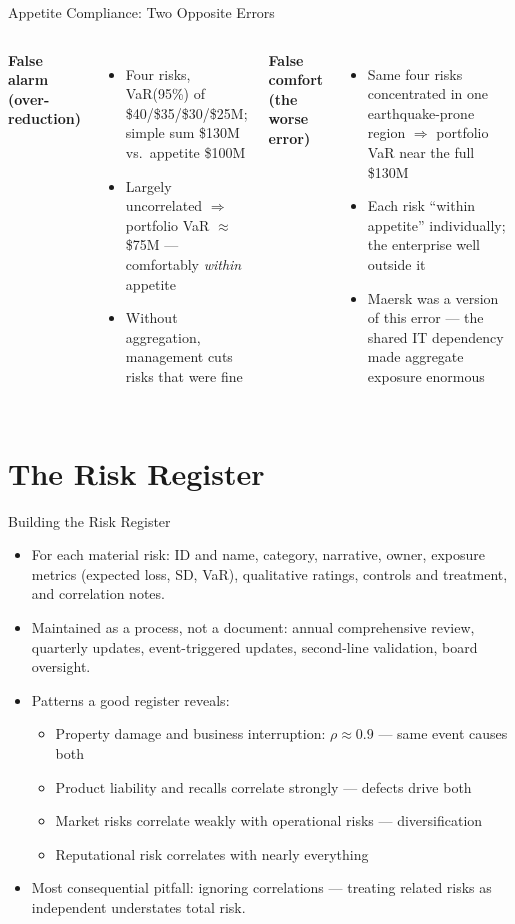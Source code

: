 \documentclass[11pt, aspectratio=169]{beamer}
\begin{document}
\begin{frame}{Appetite Compliance: Two Opposite Errors}
\begin{columns}[T]
\textbf{False alarm (over-reduction)}
\begin{itemize}
  \item Four risks, VaR(95\%) of \$40/\$35/\$30/\$25M; simple sum \$130M vs.\ appetite \$100M
  \item Largely uncorrelated $\Rightarrow$ portfolio VaR $\approx$ \$75M --- comfortably \emph{within} appetite
  \item Without aggregation, management cuts risks that were fine
\end{itemize}
\textbf{False comfort (the worse error)}
\begin{itemize}
  \item Same four risks concentrated in one earthquake-prone region $\Rightarrow$ portfolio VaR near the full \$130M
  \item Each risk ``within appetite'' individually; the enterprise well outside it
  \item Maersk was a version of this error --- the shared IT dependency made aggregate exposure enormous
\end{itemize}
\end{columns}
\end{frame}

\section{The Risk Register}

\begin{frame}{Building the Risk Register}
\begin{itemize}
  \item For each material risk: ID and name, category, narrative, \alert{owner}, exposure metrics (expected loss, SD, VaR), qualitative ratings, controls and treatment, and \alert{correlation notes}.
  \item Maintained as a process, not a document: annual comprehensive review, quarterly updates, event-triggered updates, second-line validation, board oversight.
  \item Patterns a good register reveals:
  \begin{itemize}
    \item Property damage and business interruption: $\rho \approx 0.9$ --- same event causes both
    \item Product liability and recalls correlate strongly --- defects drive both
    \item Market risks correlate weakly with operational risks --- diversification
    \item Reputational risk correlates with nearly everything
  \end{itemize}
  \item Most consequential pitfall: \alert{ignoring correlations} --- treating related risks as independent understates total risk.
\end{itemize}
\end{frame}
\end{document}
